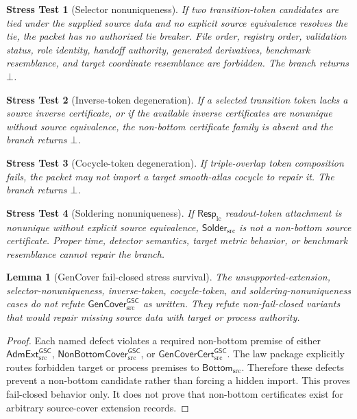 \documentclass[11pt]{article}
\newcommand{\RespLC}{\mathsf{Resp}_{\mathrm{lc}}}
\newcommand{\GenCover}{\mathsf{GenCover}_{\mathrm{src}}^{\mathsf{GSC}}}
\newcommand{\AdmExt}{\mathsf{AdmExt}_{\mathrm{src}}^{\mathsf{GSC}}}
\newcommand{\NonBottom}{\mathsf{NonBottomCover}_{\mathrm{src}}^{\mathsf{GSC}}}
\newcommand{\Cert}{\mathsf{GenCoverCert}_{\mathrm{src}}^{\mathsf{GSC}}}
\newcommand{\BottomSrc}{\mathsf{Bottom}_{\mathrm{src}}}
\newcommand{\SolderSrc}{\mathsf{Solder}_{\mathrm{src}}}
\newcommand{\Bot}{\bot}
\newtheorem{stress}{Stress Test}
\newtheorem{lemma}{Lemma}
\begin{document}
\begin{stress}[Selector nonuniqueness]
If two transition-token candidates are tied under the supplied source data and
no explicit source equivalence resolves the tie, the packet has no authorized
tie breaker. File order, registry order, validation status, role identity,
handoff authority, generated derivatives, benchmark resemblance, and target
coordinate resemblance are forbidden. The branch returns \(\Bot\).
\end{stress}

\begin{stress}[Inverse-token degeneration]
If a selected transition token lacks a source inverse certificate, or if the
available inverse certificates are nonunique without source equivalence, the
non-bottom certificate family is absent and the branch returns \(\Bot\).
\end{stress}

\begin{stress}[Cocycle-token degeneration]
If triple-overlap token composition fails, the packet may not import a target
smooth-atlas cocycle to repair it. The branch returns \(\Bot\).
\end{stress}

\begin{stress}[Soldering nonuniqueness]
If \(\RespLC\) readout-token attachment is nonunique without explicit source
equivalence, \(\SolderSrc\) is not a non-bottom source certificate. Proper
time, detector semantics, target metric behavior, or benchmark resemblance
cannot repair the branch.
\end{stress}

\begin{lemma}[GenCover fail-closed stress survival]
The unsupported-extension, selector-nonuniqueness, inverse-token,
cocycle-token, and soldering-nonuniqueness cases do not refute
\(\GenCover\) as written. They refute non-fail-closed variants that would
repair missing source data with target or process authority.
\end{lemma}

\begin{proof}
Each named defect violates a required non-bottom premise of either
\(\AdmExt\), \(\NonBottom\), or \(\Cert\). The law package explicitly routes
forbidden target or process premises to \(\BottomSrc\). Therefore these
defects prevent a non-bottom candidate rather than forcing a hidden import.
This proves fail-closed behavior only. It does not prove that non-bottom
certificates exist for arbitrary source-cover extension records.
\end{proof}
\end{document}
